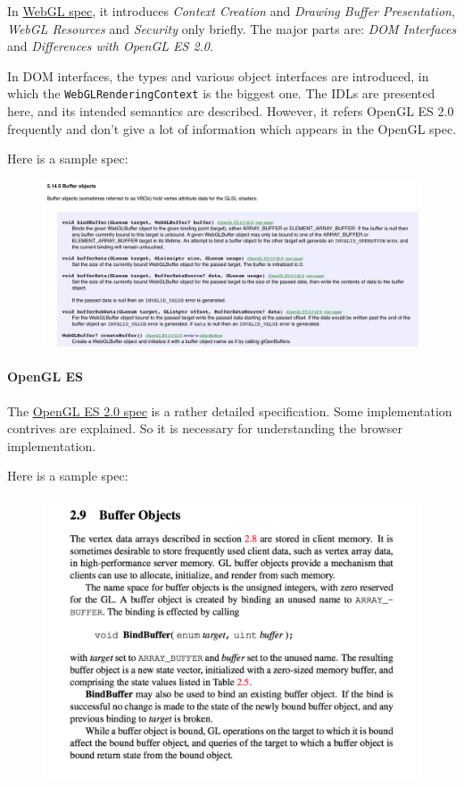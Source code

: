 \documentclass[]{article}
\begin{document}
In \href{https://www.khronos.org/registry/webgl/specs/latest/1.0/}{WebGL
spec}, it introduces \emph{Context Creation} and \emph{Drawing Buffer
Presentation}, \emph{WebGL Resources} and \emph{Security} only briefly.
The major parts are: \emph{DOM Interfaces} and \emph{Differences with
OpenGL ES 2.0}.

In DOM interfaces, the types and various object interfaces are
introduced, in which the \texttt{WebGLRenderingContext} is the biggest
one. The IDLs are presented here, and its intended semantics are
described. However, it refers OpenGL ES 2.0 frequently and don't give a
lot of information which appears in the OpenGL spec.

Here is a sample spec:

\begin{figure}[htbp]
\centering
\includegraphics{images/webgl-spec.png}
\end{figure}

\paragraph{OpenGL ES}\label{opengl-es}

The
\href{https://www.khronos.org/registry/gles/specs/2.0/es_full_spec_2.0.25.pdf}{OpenGL
ES 2.0 spec} is a rather detailed specification. Some implementation
contrives are explained. So it is necessary for understanding the
browser implementation.

Here is a sample spec:

\begin{figure}[htbp]
\centering
\includegraphics{images/opengl-spec.png}
\end{figure}
\end{document}
